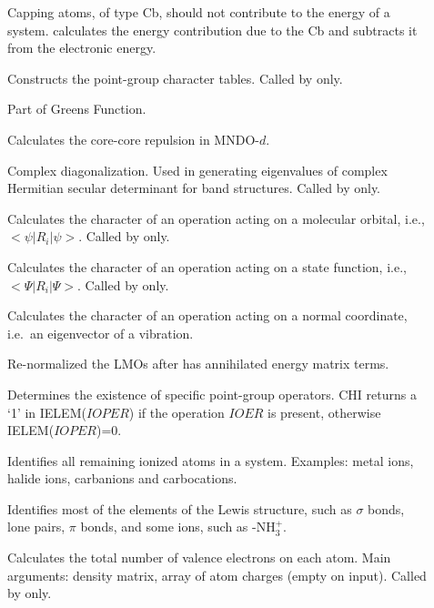 \begin{description}
\item[] Capping atoms, of type Cb, should not contribute to  the
energy of a system.   calculates the energy  contribution due to
the Cb and subtracts it from the  electronic energy.

\item[] Constructs the point-group character tables. Called by
 only.

\item[] Part of Greens Function.

\item[] Calculates the core-core repulsion in MNDO-$d$.

\item[] Complex diagonalization.  Used in generating eigenvalues of
complex Hermitian secular determinant for band structures. Called by
 only.

\item[] Calculates the character of an operation acting on a
molecular orbital, i.e., $<\psi|R_i|\psi>$.  Called by  only.

\item[] Calculates the character of an operation acting on a state
function, i.e., $<\Psi|R_i|\Psi>$.  Called by  only.

\item[] Calculates the character of an operation acting on a
normal coordinate, i.e.\ an eigenvector of a vibration. 

\item[] Re-normalized the LMOs after  has annihilated
energy matrix terms.

\item[] Determines the existence of specific point-group operators.
CHI returns a `1' in IELEM($IOPER$) if the operation $IOER$ is present,
otherwise IELEM($IOPER$)=0.

\item[] Identifies all remaining ionized atoms in a system.
Examples: metal ions, halide ions, carbanions and carbocations.

\item[] Identifies most of the elements of the Lewis structure,
such as $\sigma$ bonds, lone pairs, $\pi$ bonds, and some ions, such as
-NH$_3^+$.

\item[] Calculates the total number of valence electrons on
each atom. Main arguments: density matrix, array of atom charges (empty on
input). Called by  only.


\end{description}
